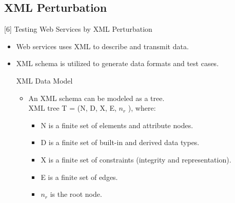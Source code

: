 \documentclass[10pt]{beamer}
\begin{document}
\subsection{XML Perturbation}
\begin{frame}{[6] Testing Web Services by XML Perturbation}
	\begin{itemize}
		
\item Web services uses XML to describe and transmit data.
\item XML schema is utilized to generate data formats and test cases.
\begin{block}{XML Data Model}
	\begin{itemize}
		\item An XML schema can be modeled as a tree.\\
		XML tree T = (N, D, X, E, $n_r$ ), where:
		\begin{itemize}
			\item N is a finite set of elements and attribute nodes.
			\item D is a finite set of built-in and derived data types.
			\item X is a finite set of constraints (integrity and representation).
			\item E is a finite set of edges.
			
			\item   $n_r$ is the root node.
		\end{itemize}
		
	\end{itemize}
\end{block}
		
	\end{itemize}

\end{frame}

%
% 
\end{document}
